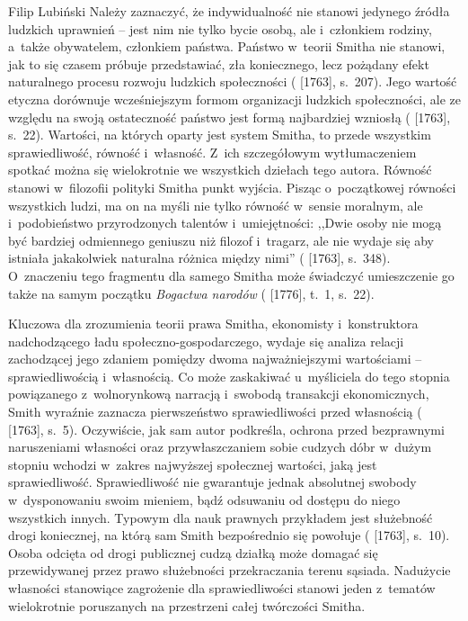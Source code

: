 \begin{artplenv}{Filip Lubiński}
 Należy zaznaczyć, że indywidualność nie stanowi jedynego źródła ludzkich uprawnień -- jest nim nie tylko bycie
osobą, ale i~członkiem rodziny, a~także obywatelem, członkiem państwa. Państwo w~teorii Smitha nie stanowi, jak to się
czasem próbuje przedstawiać, zła koniecznego, lecz pożądany efekt naturalnego procesu rozwoju ludzkich społeczności
(\cite{smith_lectures_1982} [1763], s.~207).
Jego wartość etyczna dorównuje wcześniejszym formom organizacji
ludzkich społeczności, ale ze względu na swoją ostateczność państwo jest formą najbardziej wzniosłą
(\cite{smith_lectures_1982} [1763], s.~22).
Wartości, na których oparty jest system Smitha, to przede
wszystkim sprawiedliwość, równość i~własność. Z~ich szczegółowym wytłumaczeniem spotkać można się wielokrotnie we
wszystkich dziełach tego autora. Równość stanowi w~filozofii polityki Smitha punkt wyjścia. Pisząc o~początkowej
równości wszystkich ludzi, ma on na myśli nie tylko równość w~sensie moralnym, ale i~podobieństwo przyrodzonych
talentów i~umiejętności: ,,Dwie osoby nie mogą być bardziej odmiennego geniuszu niż filozof i~tragarz, ale nie wydaje
się aby istniała jakakolwiek naturalna różnica między nimi''
(\cite{smith_lectures_1982} [1763], s.~348).
O~znaczeniu tego fragmentu dla samego Smitha może świadczyć umieszczenie go także na samym początku \textit{Bogactwa
narodów}
(\cite{smith_badania_2007} [1776], t.~1, s.~22).

Kluczowa dla zrozumienia teorii prawa Smitha, ekonomisty i~konstruktora nadchodzącego ładu społeczno-gospodarczego,
wydaje się analiza relacji zachodzącej jego zdaniem pomiędzy dwoma najważniejszymi
wartościami -- sprawiedliwością i~własnością. Co może zaskakiwać u~myśliciela do
tego stopnia powiązanego z~wolnorynkową narracją i~swobodą transakcji
ekonomicznych, Smith wyraźnie zaznacza pierwszeństwo sprawiedliwości przed własnością
(\cite{smith_lectures_1982} [1763], s.~5).
Oczywiście, jak sam autor podkreśla, ochrona przed bezprawnymi naruszeniami własności oraz
przywłaszczaniem sobie cudzych dóbr w~dużym stopniu wchodzi w~zakres najwyższej społecznej wartości, jaką jest
sprawiedliwość. Sprawiedliwość nie gwarantuje jednak absolutnej swobody w~dysponowaniu swoim mieniem, bądź odsuwaniu od
dostępu do niego wszystkich innych. Typowym dla nauk prawnych przykładem jest służebność drogi koniecznej, na którą sam
Smith bezpośrednio się powołuje
(\cite{smith_lectures_1982} [1763], s.~10).
Osoba odcięta od drogi publicznej
cudzą działką może domagać się przewidywanej przez prawo służebności przekraczania terenu sąsiada. Nadużycie własności
stanowiące zagrożenie dla sprawiedliwości stanowi jeden z~tematów wielokrotnie poruszanych na przestrzeni całej
twórczości Smitha.


\end{artplenv}
